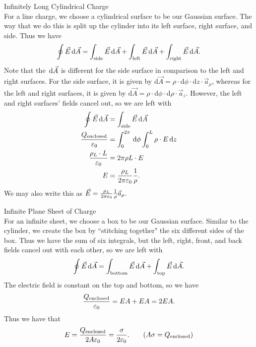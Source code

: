 \documentclass[class=article, crop=false]{standalone}
\begin{document}
  \begin{example}{Infinitely Long Cylindrical Charge}\\
    For a line charge, we choose a cylindrical surface to be our Gaussian surface. The way that we do this is split up the cylinder into its left surface, right surface, and side. Thus we have
    \[
      \oint \vec{E}\,\mathrm{d}\vec{A} = \int_{\text{side}} \vec{E}\,\mathrm{d}\vec{A} + \int_{\text{left}} \vec{E}\,\mathrm{d}\vec{A} + \int_{\text{right}} \vec{E}\,\mathrm{d}\vec{A}.
    \]
    Note that the $\,\mathrm{d}\vec{A}$ is different for the side surface in comparison to the left and right surfaces. For the side surface, it is given by $\mathrm{d}\vec{A} = \rho\cdot \mathrm{d}\phi\cdot \mathrm{d}z\cdot \vec{a}_\rho$, whereas for the left and right surfaces, it is given by $\mathrm{d}\vec{A} = \rho\cdot \mathrm{d}\phi\cdot \mathrm{d}\rho\cdot \vec{a}_z$. However, the left and right surfaces' fields cancel out, so we are left with
    \begin{align*}
      \oint \vec{E}\,\mathrm{d}\vec{A} &= \int_{\text{side}} \vec{E}\,\mathrm{d}\vec{A} \\
      \frac{Q_{\text{enclosed}}}{\varepsilon_0} &= \int_{0}^{2\pi}\,\mathrm{d}\phi \int_{0}^{L}\rho\cdot E \,\mathrm{d}z \\
      \frac{\rho_L\cdot L}{\varepsilon_0} &= 2\pi\rho L\cdot E \\
      E &= \frac{\rho_L}{2\pi\varepsilon_0}\frac{1}{\rho}.
    \end{align*}
    We may also write this as $\vec{E} = \frac{\rho_L}{2\pi\varepsilon_0}\frac{1}{\rho}\vec{a}_\rho$.
  \end{example}
  \begin{example}{Infinite Plane Sheet of Charge}\\
    For an infinite sheet, we choose a box to be our Gaussian surface. Similar to the cylinder, we create the box by ``stitching together" the six different sides of the box. Thus we have the sum of six integrals, but the left, right, front, and back fields cancel out with each other, so we are left with
    \[
      \oint \vec{E}\,\mathrm{d}\vec{A} = \int_{\text{bottom}}\vec{E}\,\mathrm{d}\vec{A} + \int_{\text{top}}\vec{E}\,\mathrm{d}\vec{A}.
    \]
    The electric field is constant on the top and bottom, so we have
    \[
      \frac{Q_{\text{enclosed}}}{\varepsilon_0} = EA + EA = 2EA.
    \]
    Thus we have that
    \[
      E = \frac{Q_{\text{enclosed}}}{2A\eps_0} = \frac{\sigma}{2\eps_0}. \tag{$A\sigma = Q_{\text{enclosed}}$}
    \]
  \end{example}
\end{document}

